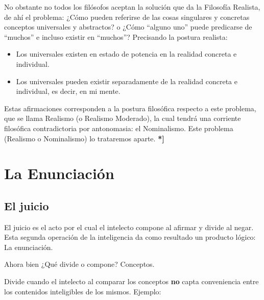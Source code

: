 \documentclass{article}
\begin{document}
    No obstante no todos los filósofos aceptan la solución que da la Filosofía Realista, de ahí el problema: ¿Cómo pueden referirse de las cosas singulares y concretas conceptos universales y abstractos? o ¿Cómo ``alguno uno'' puede predicarse de ``muchos'' e incluso existir en ``muchos''? 
    Precisando la postura realista: \par
    \begin{itemize}[label={$\bullet$}]
        \item Los universales existen en estado de potencia en la realidad concreta e individual.
        \item Los universales pueden existir separadamente de la realidad concreta e individual, es decir, en mi mente.
    \end{itemize}
    Estas afirmaciones corresponden a la postura filosófica respecto a este problema, que se llama Realismo (o Realismo Moderado), la cual tendrá una corriente filosófica contradictoria por antonomasia: el Nominalismo. Este problema (Realismo o Nominalismo) lo trataremos aparte. \textbf{*]} \par
    
\newpage

\section{La Enunciación}

\subsection{El juicio}
 El juicio es el acto por el cual el intelecto compone al afirmar y divide al negar. Esta segunda operación de la inteligencia da como resultado un producto lógico: La enunciación.
 \par Ahora bien ¿Qué divide o compone? Conceptos. \\
 \par Divide cuando el intelecto al comparar los conceptos \textbf{no} capta conveniencia entre los contenidos inteligibles de los mismos. Ejemplo: \\
    
\end{document}
